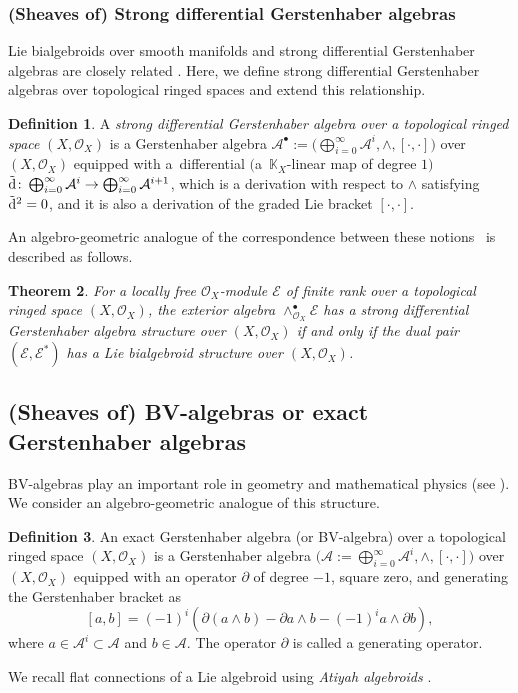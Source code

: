 \documentclass[pdftex]{sigma}
\numberwithin{equation}{section}
\newtheorem{Thm}{Theorem}[section]
\theoremstyle{definition}
\newtheorem{Def}[Thm]{Definition}
\begin{document}
\subsubsection{(Sheaves of) Strong differential Gerstenhaber algebras} \label{strong diff G-algs}
Lie bialgebroids over smooth manifolds and strong differential Gerstenhaber algebras are closely related \cite{KS, PX}. Here, we define strong differential Gerstenhaber algebras over topological ringed spaces and extend this relationship.
\begin{Def}
	A \emph{strong differential Gerstenhaber algebra over a topological ringed space} $(X, \mathcal{O}_X)$ is a Gerstenhaber algebra $\mathcal{A}^\bullet:=\bigl(\bigoplus^{\infty}_{i=0} \mathcal{A}^i, \wedge, [\cdot, \cdot]\bigr)$ over $(X,\mathcal{O}_X)$ equipped with a~differential $($a~$\mathbb{K}_X$-linear map of degree $1)$
	$\tilde{{\rm d}}\colon \bigoplus^{\infty}_{i=0} \mathcal{A}^i \rightarrow \bigoplus^{\infty}_{i=0} \mathcal{A}^{i+1}$, which is a derivation with respect to $\wedge$ satisfying $\tilde{{\rm d}}^2=0$, and it is also a derivation of the graded Lie bracket $[\cdot, \cdot]$.
\end{Def}

An algebro-geometric analogue of the correspondence between these notions~\cite{KS} is described as follows.
\begin{Thm} \label{SDGA & LBA}
For a locally free $\mathcal{O}_X$-module $\mathcal{E}$ of finite rank over a topological ringed space $(X,\mathcal{O}_X)$, the exterior algebra $\wedge_{\mathcal{O}_X}^\bullet\mathcal{E}$ has a strong differential Gerstenhaber algebra structure over $(X,\mathcal{O}_X)$ if and only if the dual pair $(\mathcal{E}, \mathcal{E}^*)$ has a Lie bialgebroid structure over $(X,\mathcal{O}_X)$.
\end{Thm}

\subsection{(Sheaves of) BV-algebras or exact Gerstenhaber algebras}
BV-algebras play an important role in geometry and mathematical physics (see \cite{JH1, KS, PX}). We consider an algebro-geometric analogue of this structure.
\begin{Def}	An exact Gerstenhaber algebra (or BV-algebra) over a topological ringed space $(X,\mathcal{O}_X)$ is a Gerstenhaber algebra $\bigl(\mathcal{A}:=\bigoplus^{\infty}_{i=0} \mathcal{A}^i, \wedge, [\cdot, \cdot]\bigr)$ over $(X,\mathcal{O}_X)$ equipped with an operator $\partial$ of degree $-1$, square zero, and generating the Gerstenhaber bracket as
\[
[a, b]= (-1)^{i}(\partial(a \wedge b)- \partial a \wedge b- (-1)^i a \wedge \partial b ),
\]
	where $a \in \mathcal{A}^i \subset \mathcal{A}$ and $b \in \mathcal{A}$. The operator $\partial$ is called a generating operator.	
\end{Def}
We recall flat connections of a Lie algebroid using \emph{Atiyah algebroids} \cite{UB,MK,BP,AS,PT}.
\end{document}
